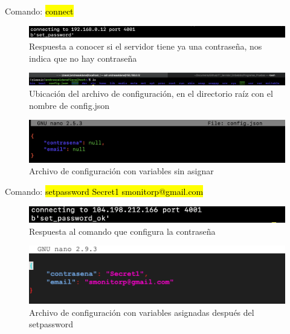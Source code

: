 Comando: \hl{connect}
\begin{figure}[H]
	\centering
	\includegraphics[scale=.5]{Capitulo5/images/connect.png}
	\caption{Respuesta a conocer si el servidor tiene ya una contraseña, nos indica que no hay contraseña}
	\label{fig:}
\end{figure} 

\begin{figure}[H]
	\centering
	\includegraphics[scale=.35]{Capitulo5/images/listconfig.png}
	\caption{Ubicación del archivo de configuración, en el directorio raíz con el nombre de config.json}
	\label{fig:}
\end{figure} 

\begin{figure}[H]
	\centering
	\includegraphics[scale=.5]{Capitulo5/images/nullconfig.png}
	\caption{Archivo de configuración con variables sin asignar}
	\label{fig:}
\end{figure} 

Comando: \hl{setpassword Secret1 smonitorp@gmail.com}
\begin{figure}[H]
	\centering
	\includegraphics[scale=.5]{Capitulo5/images/set_password.png}
	\caption{Respuesta al comando que configura la contraseña}
	\label{fig:}
\end{figure} 

\begin{figure}[H]
	\centering
	\includegraphics[scale=.6]{Capitulo5/images/setconfig.png}
	\caption{Archivo de configuración con variables asignadas después del setpassword}
	\label{fig:}
\end{figure} 

